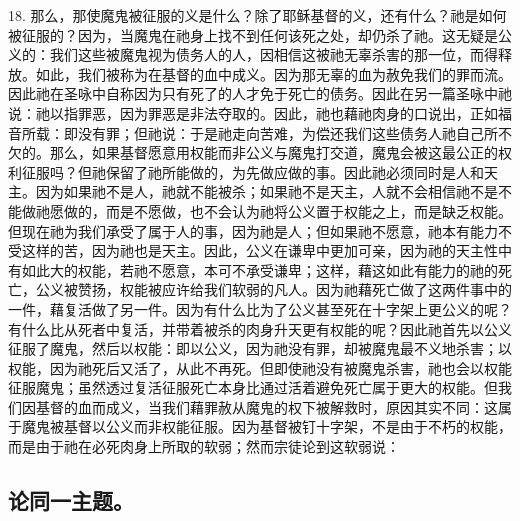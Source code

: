 18. 那么，那使魔鬼被征服的义是什么？除了耶稣基督的义，还有什么？祂是如何被征服的？因为，当魔鬼在祂身上找不到任何该死之处，却仍杀了祂。这无疑是公义的：我们这些被魔鬼视为债务人的人，因相信这被祂无辜杀害的那一位，而得释放。如此，我们被称为在基督的血中成义。因为那无辜的血为赦免我们的罪而流。因此祂在圣咏中自称因为只有死了的人才免于死亡的债务。因此在另一篇圣咏中祂说：祂以指罪恶，因为罪恶是非法夺取的。因此，祂也藉祂肉身的口说出，正如福音所载：即没有罪；但祂说：于是祂走向苦难，为偿还我们这些债务人祂自己所不欠的。那么，如果基督愿意用权能而非公义与魔鬼打交道，魔鬼会被这最公正的权利征服吗？但祂保留了祂所能做的，为先做应做的事。因此祂必须同时是人和天主。因为如果祂不是人，祂就不能被杀；如果祂不是天主，人就不会相信祂不是不能做祂愿做的，而是不愿做，也不会认为祂将公义置于权能之上，而是缺乏权能。但现在祂为我们承受了属于人的事，因为祂是人；但如果祂不愿意，祂本有能力不受这样的苦，因为祂也是天主。因此，公义在谦卑中更加可亲，因为祂的天主性中有如此大的权能，若祂不愿意，本可不承受谦卑；这样，藉这如此有能力的祂的死亡，公义被赞扬，权能被应许给我们软弱的凡人。因为祂藉死亡做了这两件事中的一件，藉复活做了另一件。因为有什么比为了公义甚至死在十字架上更公义的呢？有什么比从死者中复活，并带着被杀的肉身升天更有权能的呢？因此祂首先以公义征服了魔鬼，然后以权能：即以公义，因为祂没有罪，却被魔鬼最不义地杀害；以权能，因为祂死后又活了，从此不再死。但即使祂没有被魔鬼杀害，祂也会以权能征服魔鬼；虽然透过复活征服死亡本身比通过活着避免死亡属于更大的权能。但我们因基督的血而成义，当我们藉罪赦从魔鬼的权下被解救时，原因其实不同：这属于魔鬼被基督以公义而非权能征服。因为基督被钉十字架，不是由于不朽的权能，而是由于祂在必死肉身上所取的软弱；然而宗徒论到这软弱说：\par


\subsection{论同一主题。}


